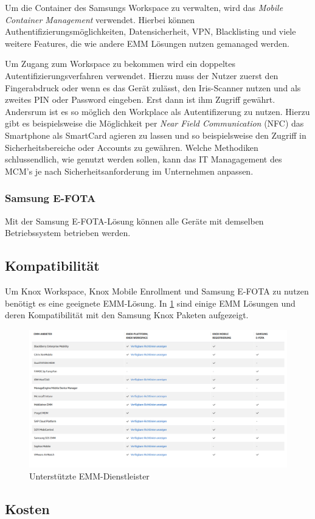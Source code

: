 Um die Container des Samsungs Workspace zu verwalten, wird das \textit{Mobile Container Management} verwendet. Hierbei können Authentifizierungsmöglichkeiten, Datensicherheit,  VPN, Blacklisting und viele weitere Features, die wie andere EMM Lösungen nutzen gemanaged werden.

Um Zugang zum Workspace zu bekommen wird ein doppeltes Autentifizierungsverfahren verwendet. Hierzu muss der Nutzer zuerst den Fingerabdruck oder wenn es das Gerät zulässt, den Iris-Scanner nutzen und als zweites PIN oder Password eingeben. Erst dann ist ihm Zugriff gewährt.
Andersrum ist es so möglich den Workplace als Autentifizerung zu nutzen. Hierzu gibt es beispielsweise die Möglichkeit per \textit{Near Field Communication} (NFC) das Smartphone als SmartCard agieren zu lassen und so beispielsweise den Zugriff in Sicherheitsbereiche oder Accounts zu gewähren.
Welche Methodiken schlussendlich, wie genutzt werden sollen, kann das IT Managagement des MCM's je nach Sicherheitsanforderung im Unternehmen anpassen.

\subsubsection{Samsung E-FOTA}
Mit der Samsung E-FOTA-Lösung können alle Geräte mit demselben Betriebssystem betrieben werden.


\subsection{Kompatibilität}
Um Knox Workspace, Knox Mobile Enrollment und Samsung E-FOTA zu nutzen benötigt es eine geeignete EMM-Lösung. In \cref{fig:SamKno3} sind einige EMM Lösungen und deren Kompatibilität mit den Samsung Knox Paketen aufgezeigt.
\begin{figure}[hbt]
\centering
\includegraphics[width=1\textwidth]{Bilder/sk_3}
\caption{Unterstützte EMM-Dienstleister}\label{fig:SamKno3}
\end{figure}

\subsection{Kosten}






















